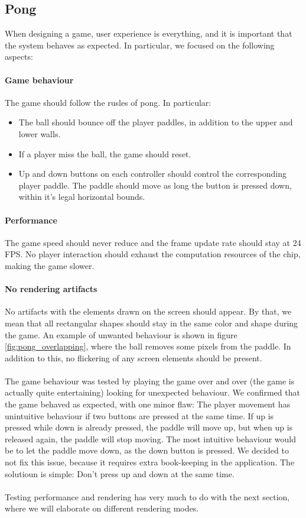 \subsection{Pong}
\label{subsection:pong-testing}
When designing a game, user experience is everything, and it is important that the system behaves as expected. In particular, we focused on the following aspects:

\paragraph{Game behaviour}
The game should follow the rusles of pong. In particular:
\begin{itemize}
	\item The ball should bounce off the player paddles, in addition to the upper and lower walls.
	\item If a player miss the ball, the game should reset.
	\item Up and down buttons on each controller should control the corresponding player paddle. The paddle should move as long the button is pressed down, within it's legal horizontal bounds.
\end{itemize}

\paragraph{Performance}
The game speed should never reduce and the frame update rate should stay at 24 FPS. No player interaction should exhaust the computation resources of the chip, making the game slower.  

\paragraph{No rendering artifacts}
No artifacts with the elements drawn on the screen should appear. By that, we mean that all rectangular shapes should stay in the same color and shape during the game. An example of unwanted behaviour is shown in figure \ref{fig:pong_overlapping}, where the ball removes some pixels from the paddle. In addition to this, no flickering of any screen elements should be present. \\
\\
The game behaviour was tested by playing the game over and over (the game is actually quite entertaining) looking for unexpected behaviour. We confirmed that the game behaved as expected, with one minor flaw: The player movement has unintuitive behaviour if two buttons are pressed at the same time. If up is pressed while down is already pressed, the paddle will move up, but when up is released again, the paddle will stop moving. The most intuitive behaviour would be to let the paddle move down, as the down button is pressed. We decided to not fix this issue, because it requires extra book-keeping in the application. The solutioun is simple: Don't press up and down at the same time.\\
\\
Testing performance and rendering has very much to do with the next section, where we will elaborate on different rendering modes.

